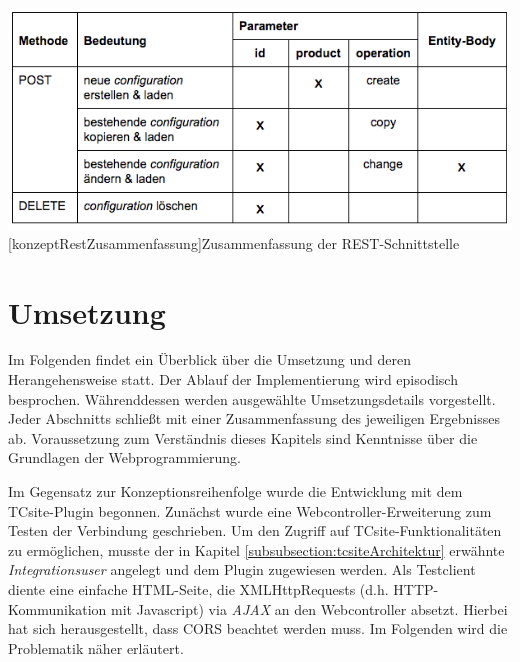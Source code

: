\documentclass[11pt, a4paper, titlepage, listof=totoc, bibliography=totoc, index=totoc, twoside, openright, headings=normal]{scrreprt}
\begin{document}
\vspace{1em}
\begin{minipage}{\linewidth}
	\centering
	\includegraphics[width=1\linewidth]{Abbildungen/konzeptRestZusammenfassung.png}
	[konzeptRestZusammenfassung]{Zusammenfassung der REST-Schnittstelle}
	\label{fig:konzeptRestZusammenfassung}
\end{minipage}
\vspace{1em}

\pagebreak

\section{Umsetzung}
\label{section:Umsetzung}
Im Folgenden findet ein Überblick über die Umsetzung und deren Herangehensweise statt. Der Ablauf der Implementierung wird episodisch besprochen. Währenddessen werden ausgewählte Umsetzungsdetails vorgestellt. Jeder Abschnitts schließt mit einer Zusammenfassung des jeweiligen Ergebnisses ab. Voraussetzung zum Verständnis dieses Kapitels sind Kenntnisse über die Grundlagen der Webprogrammierung.

Im Gegensatz zur Konzeptionsreihenfolge wurde die Entwicklung mit dem TCsite-Plugin begonnen. Zunächst wurde eine Webcontroller-Erweiterung zum Testen der Verbindung geschrieben. Um den Zugriff auf TCsite-Funktionalitäten zu ermöglichen, musste der in Kapitel \ref{subsubsection:tcsiteArchitektur} erwähnte \emph{Integrationsuser} angelegt und dem Plugin zugewiesen werden. Als Testclient diente eine einfache HTML-Seite, die XMLHttpRequests (d.h. HTTP-Kommunikation mit Javascript) via  \emph{AJAX} an den Webcontroller absetzt. Hierbei hat sich herausgestellt, dass  \ac{CORS} beachtet werden muss. Im Folgenden wird die Problematik näher erläutert.
\end{document}

